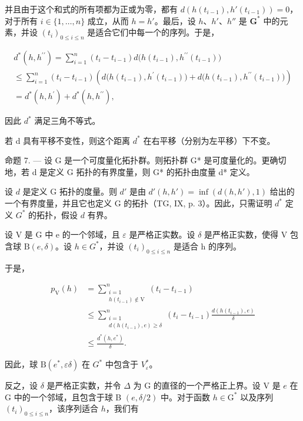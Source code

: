 并且由于这个和式的所有项都为正或为零，都有 \(d(h(t_{i-1}), h'(t_{i-1})) = 0\)，对于所有 \(i \in \{1, \ldots, n\}\) 成立，从而 \(h = h'\)。最后，设 \(h\)、\(h'\)、\(h''\) 是 \(\mathbf{G}^*\) 中的元素，并设 \((t_i)_{0 \leqslant i \leqslant n}\) 是适合它们中每一个的序列。于是，

\[
\begin{array}{l} d ^ {*} (h, h ^ {\prime \prime}) = \sum_ {i = 1} ^ {n} (t _ {i} - t _ {i - 1}) d \big (h (t _ {i - 1}), h ^ {\prime \prime} (t _ {i - 1}) \big) \\ \leqslant \sum_ {i = 1} ^ {n} (t _ {i} - t _ {i - 1}) \left(d \big (h (t _ {i - 1}), h ^ {\prime} (t _ {i - 1}) \big) + d \big (h (t _ {i - 1}), h ^ {\prime \prime} (t _ {i - 1}) \big)\right) \\ = d ^ {*} (h, h ^ {\prime}) + d ^ {*} (h, h ^ {\prime \prime}), \end{array}
\]

因此 \(d^{*}\) 满足三角不等式。

若 d 具有平移不变性，则这个距离 \(d^{*}\) 在右平移（分别为左平移）下不变。

命题 7. --- 设 G 是一个可度量化拓扑群。则拓扑群 G* 是可度量化的。更确切地，若 d 是定义 G 拓扑的有界度量，则 G* 的拓扑由度量 d* 定义。

设 \(d\) 是定义 G 拓扑的度量。则 \(d'\) 是由 \(d'(h,h') = \inf (d(h,h'),1)\) 给出的一个有界度量，并且它也定义 G 的拓扑（TG, IX, p. 3）。因此，只需证明 \(d^{*}\) 定义 \(G^{*}\) 的拓扑，假设 \(d\) 有界。

设 V 是 G 中 e 的一个邻域，且 \(\varepsilon\) 是严格正实数。设 \(\delta\) 是严格正实数，使得 V 包含球 \(\mathrm{B}(e,\delta)\)。设 \(h \in G^{*}\)，并设 \((t_{i})_{0 \leqslant i \leqslant n}\) 是适合 h 的序列。

于是，

\[
\begin{aligned} p_{\mathrm{V}}(h) & = \sum_{\substack{i = 1\\ h(t_{i - 1})\not\in\mathrm{V}}}^{n}(t_{i} - t_{i - 1})\\ & \leqslant \sum_{\substack{i = 1\\ d(h(t_{i - 1}),e)\geqslant \delta}}^{n}(t_{i} - t_{i - 1})\frac{d(h(t_{i - 1}),e)}{\delta}\\ & \leqslant \frac{d^{*}(h,e^{*})}{\delta}. \end{aligned}
\]

因此，球 \(\mathrm{B}(e^{*},\varepsilon\delta)\) 在 \(G^{*}\) 中包含于 \(V_{\varepsilon}^{*}\)。

反之，设 \(\delta\) 是严格正实数，并令 \(\Delta\) 为 G 的直径的一个严格正上界。设 V 是 \(e\) 在 G 中的一个邻域，且包含于球 B \((e,\delta/2)\) 中。对于函数 \(h\in\mathrm{G}^{*}\) 以及序列 \((t_{i})_{0\leqslant i\leqslant n}\)，该序列适合 \(h\)，我们有

